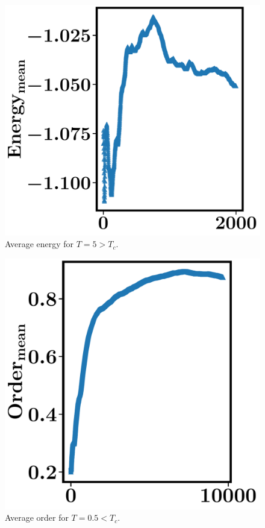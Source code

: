 \documentclass[12pt,letterpaper]{article}
\begin{document}
\begin{figure}[ht]
  \centering
    \includegraphics[width=\textwidth]{figures/plot_energy_T5.pdf}
    \caption{Average energy for $T = 5 > T_c$.}
     \label{fig:E0.5}
\end{figure}



\begin{figure}[ht]
  \centering
    \includegraphics[width=\textwidth]{figures/plot_order_T0-5.pdf}
    \caption{Average order for $T = 0.5 < T_c$.}
     \label{fig:E0.5}
\end{figure}
\end{document}
